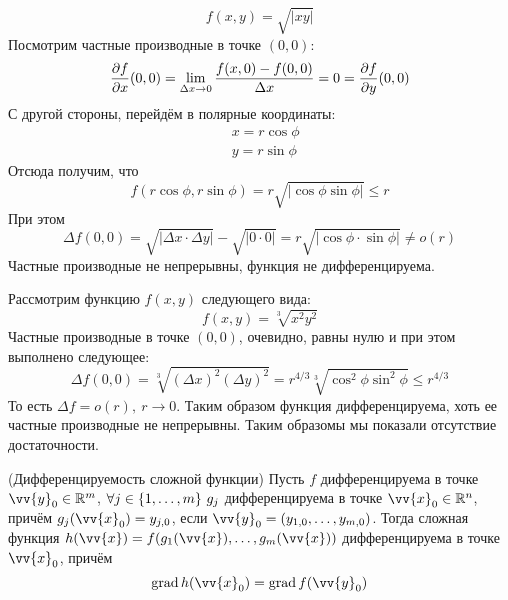 \begin{example}
	\[
		f(x, y) = \sqrt{|xy|}
	\]
	Посмотрим частные производные в точке $(0, 0)$:
	\[
		\frac{\partial f}{\partial x} (0, 0) = \lim\limits_{\Delta x \to 0} \frac{f(x, 0) - f(0, 0)}{\Delta x} = 0 = \frac{\partial f}{\partial y} (0, 0)
	\]
	С другой стороны, перейдём в полярные координаты:
	\begin{align*}
		&{x = r \cos \phi}
		\\
		&{y = r \sin \phi}
	\end{align*}
	Отсюда получим, что
	\[
		f(r \cos \phi, r \sin \phi) = r \sqrt{|\cos \phi \sin \phi|} \le r
	\]
	При этом
	\[
		\Delta f(0, 0) = \sqrt{|\Delta x \cdot \Delta y|} - \sqrt{|0 \cdot 0|} = r \sqrt{|\cos \phi \cdot \sin \phi|} \neq o(r)
	\]
	Частные производные не непрерывны, функция не дифференцируема.
\end{example}
\begin{example}
	Рассмотрим функцию $f(x, y)$ следующего вида:
	\[
		f(x, y) = \sqrt[3]{x^2 y^2}
	\]
	Частные производные в точке $(0, 0)$, очевидно, равны нулю и при этом выполнено следующее:
	\[
		\Delta f(0, 0) = \sqrt[3]{(\Delta x)^2 (\Delta y)^2} = r^{4/3} \sqrt[3]{\cos^2 \phi \sin^2 \phi} \le r^{4/3}
	\]
	То есть $\Delta f = o(r),\ r \to 0$. Таким образом функция дифференцируема, хоть ее частные производные не непрерывны. Таким образомы мы показали отсутствие достаточности.
\end{example}

\begin{theorem} (Дифференцируемость сложной функции)
	Пусть $f$ дифференцируема в точке $\vv{y}_0 \in \R^m$, $\forall j \in \range{m}\ g_j$ дифференцируема в точке $\vv{x}_0 \in \R^n$, причём $g_j(\vv{x}_0) = y_{j, 0}$, если $\vv{y}_0 = (y_{1, 0}, \ldots, y_{m, 0})$. Тогда сложная функция $h(\vv{x}) = f(g_1(\vv{x}), \ldots, g_m(\vv{x}))$ дифференцируема в точке $\vv{x}_0$, причём
	\[
		\grad h(\vv{x}_0) = \grad f(\vv{y}_0)
	\]
\end{theorem}

